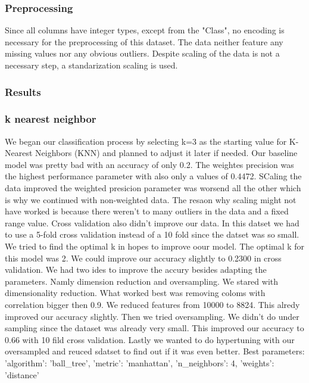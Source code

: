 \documentclass{article}
\begin{document}
\subsubsection{Preprocessing}
Since all columns have integer types, except from the "Class", no encoding is necessary for the preprocessing of this dataset. The data neither feature any missing values nor any obvious outliers. Despite scaling of the data is not a necessary step, a standarization scaling is used.


\subsubsection{Results}
\subsubsection*{k nearest neighbor}
We began our classification process by selecting k=3 as the starting value for K-Nearest Neighbors (KNN) and planned to adjust it later if needed. Our baseline model was pretty bad with an accuracy of only 0.2. The weightes precision was the highest performance parameter with also only a values of 0.4472. SCaling the data improved the weighted presicion parameter was worsend all the other which is why we continued with non-weighted data. The resaon why scaling might not have worked is because there weren't to many outliers in the data and a fixed range value. Cross validation also didn't improve our data. In this datset we had to use a 5-fold cross validation instead of a 10 fold since the datset was so small. 
We tried to find the optimal k in hopes to improve oour model. The optimal k for this model was 2. We could improve our accuracy slightly to 0.2300 in cross validation. We had two ides to improve the accury besides adapting the parameters. Namly dimension reduction and oversampling. 
We stared with dimensionality reduction. What worked best was removing coloms with correlation bigger then 0.9. We reduced features from 10000 to 8824. This alredy improved our accuracy slightly. Then we tried oversampling. We didn't do under sampling since the dataset was already very small. This improved our accuracy  to 0.66 with 10 fild cross validation. Lastly we wanted to do hypertuning with our oversampled and reuced sdatset to find out if it was even better.
Best parameters: {'algorithm': 'ball\_tree', 'metric': 'manhattan', 'n_neighbors': 4, 'weights': 'distance'}
\end{document}
